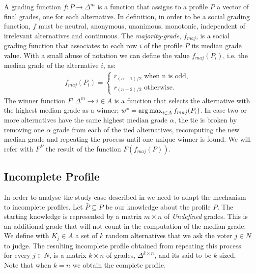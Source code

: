 \documentclass[version=3.21, pagesize, twoside=off, bibliography=totoc, DIV=calc, fontsize=12pt, a4paper]{scrartcl}
\begin{document}
A grading function $f: P \rightarrow \Delta^m$ is a function that assigns to a profile $P$ a vector of final grades, one for each alternative. In \citet{Balinski2007} definition, in order to be a social grading function, $f$ must be neutral, anonymous, unanimous, monotonic, independent of irrelevant alternatives and continuous. 
The \emph{majority-grade}, $f_{maj}$, is a social grading function that associates to each row $i$ of the profile $P$ its median grade value. With a small abuse of notation we can define the value $f_{maj}(P_i)$, i.e. the median grade of the alternative $i$, as:
\begin{align}
	f_{maj}(P_i) = \begin{cases}
		r_{(n+1)/2} \text{ when n is odd,} \\
		r_{(n+2)/2} \text{ otherwise.}
	\end{cases}
\end{align}
The winner function $F:\Delta^{m} \rightarrow i\in A$ is a function that selects the alternative with the highest median grade as a winner: $w^* = \operatorname*{arg\,max}_{i\in A}f_{maj}(P_i)$. In case two or more alternatives have the same highest median grade $\alpha$, the tie is broken by removing one $\alpha$ grade from each of the tied alternatives, recomputing the new median grade and repeating the process until one unique winner is found. We will refer with $F^P$ the result of the function $F(f_{maj}(P))$.

\subsection{Incomplete Profile}
In order to analyse the study case described in  we need to adapt the mechanism to incomplete profiles. Let $\bar{P} \subseteq P$ be our knowledge about the profile $P$. %
The starting knowledge is represented by a matrix $m\times n$ of \textit{Undefined} grades. This is an additional grade that will not count in the computation of the median grade. We define with $K_j \in A$ a set of $k$ random alternatives that we ask the voter $j\in N$ to judge. The resulting incomplete profile obtained from repeating this process for every $j \in N$, is a matrix $k \times n$ of grades, $\Delta^{k\times n}$, and its said to be $k$-sized. Note that when $k=n$ we obtain the complete profile.
\end{document}
